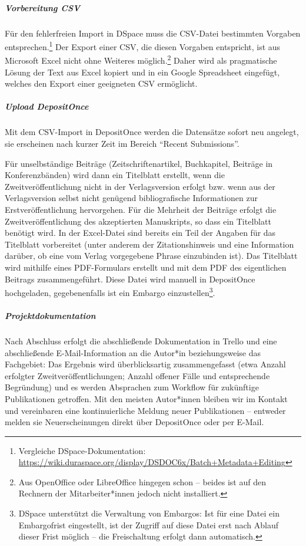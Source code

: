 \documentclass[a4paper,
fontsize=11pt,
oneside,
numbers=noperiodatend,
parskip=half-,
bibliography=totoc,
final
]{scrartcl}
\begin{document}
\hypertarget{vorbereitung-csv}{%
\subparagraph{Vorbereitung CSV}\label{vorbereitung-csv}}

Für den fehlerfreien Import in DSpace muss die CSV-Datei bestimmten
Vorgaben entsprechen.\footnote{Vergleiche DSpace-Dokumentation:
  \url{https://wiki.duraspace.org/display/DSDOC6x/Batch+Metadata+Editing}}
Der Export einer CSV, die diesen Vorgaben entspricht, ist aus Microsoft
Excel nicht ohne Weiteres möglich.\footnote{Aus OpenOffice oder
  LibreOffice hingegen schon -- beides ist auf den Rechnern der
  Mitarbeiter*innen jedoch nicht installiert.} Daher wird als
pragmatische Lösung der Text aus Excel kopiert und in ein Google
Spreadsheet eingefügt, welches den Export einer geeigneten CSV
ermöglicht.

\hypertarget{upload-depositonce}{%
\subparagraph{Upload DepositOnce}\label{upload-depositonce}}

Mit dem CSV-Import in DepositOnce werden die Datensätze sofort neu
angelegt, sie erscheinen nach kurzer Zeit im Bereich \enquote{Recent
Submissions}.

Für unselbständige Beiträge (Zeitschriftenartikel, Buchkapitel, Beiträge
in Konferenzbänden) wird dann ein Titelblatt erstellt, wenn die
Zweitveröffentlichung nicht in der Verlagsversion erfolgt bzw. wenn aus
der Verlagsversion selbst nicht genügend bibliografische Informationen
zur Erstveröffentlichung hervorgehen. Für die Mehrheit der Beiträge
erfolgt die Zweitveröffentlichung des akzeptierten Manuskripts, so dass
ein Titelblatt benötigt wird. In der Excel-Datei sind bereits ein Teil
der Angaben für das Titelblatt vorbereitet (unter anderem der
Zitationshinweis und eine Information darüber, ob eine vom Verlag
vorgegebene Phrase einzubinden ist). Das Titelblatt wird mithilfe eines
PDF-Formulars erstellt und mit dem PDF des eigentlichen Beitrags
zusammengeführt. Diese Datei wird manuell in DepositOnce hochgeladen,
gegebenenfalls ist ein Embargo einzustellen\footnote{DSpace unterstützt
  die Verwaltung von Embargos: Ist für eine Datei ein Embargofrist
  eingestellt, ist der Zugriff auf diese Datei erst nach Ablauf dieser
  Frist möglich -- die Freischaltung erfolgt dann automatisch.}.

\hypertarget{projektdokumentation}{%
\subparagraph{Projektdokumentation}\label{projektdokumentation}}

Nach Abschluss erfolgt die abschließende Dokumentation in Trello und
eine abschließende E-Mail-Information an die Autor*in beziehungsweise
das Fachgebiet: Das Ergebnis wird überblicksartig zusammengefasst (etwa
Anzahl erfolgter Zweitveröffentlichungen; Anzahl offener Fälle und
entsprechende Begründung) und es werden Absprachen zum Workflow für
zukünftige Publikationen getroffen. Mit den meisten Autor*innen bleiben
wir im Kontakt und vereinbaren eine kontinuierliche Meldung neuer
Publikationen -- entweder melden sie Neuerscheinungen direkt über
DepositOnce oder per E-Mail.
\end{document}

